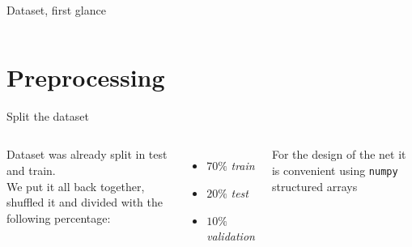 \documentclass{beamer}
\begin{document}
\begin{frame}{Dataset, first glance}
\begin{columns}
    \end{columns}

\end{frame}


\section{Preprocessing}

\begin{frame}{Split the dataset}

    \begin{columns}
    
    Dataset was already split in test and train.\\
    \vspace{10 pt}
    We put it all back together, shuffled it and divided with the following percentage:
    \begin{itemize}
        \item[\textbullet] $70\%$ \textit{train}
        \item[\textbullet] $20\%$ \textit{test}
        \item[\textbullet] $10\%$ \textit{validation}
        
    \end{itemize}
    \vspace{10 pt}

    For the design of the net it is convenient using \texttt{numpy} structured arrays
    
    
    
    
    \end{columns}

    

\end{frame}
\end{document}
